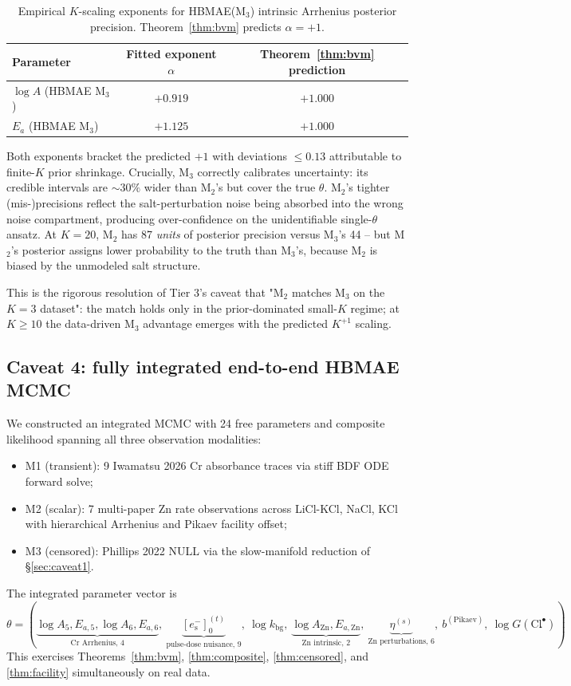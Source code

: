 \documentclass[11pt]{article}
\theoremstyle{definition}
\theoremstyle{remark}
\newcommand{\eS}{e_{\mathrm{s}}^{-}\xspace}
\newcommand{\HBMAE}{HBMAE\xspace}
\begin{document}
\begin{table}[ht]
\centering
\caption{Empirical $K$-scaling exponents for \HBMAE (M$_3$) intrinsic Arrhenius posterior
precision. Theorem~\ref{thm:bvm} predicts $\alpha = +1$.}
\label{tab:caveat3}
\begin{tabular}{l c c}
\toprule
Parameter & Fitted exponent $\alpha$ & Theorem~\ref{thm:bvm} prediction \\
\midrule
$\log A$ (\HBMAE M$_3$) & $+0.919$ & $+1.000$ \\
$E_a$ (\HBMAE M$_3$)   & $+1.125$ & $+1.000$ \\
\bottomrule
\end{tabular}
\end{table}

Both exponents bracket the predicted $+1$ with deviations $\le 0.13$ attributable to
finite-$K$ prior shrinkage. Crucially, M$_3$ correctly calibrates uncertainty: its
credible intervals are $\sim 30\%$ wider than M$_2$'s but cover the true $\theta$.
M$_2$'s tighter (mis-)precisions reflect the salt-perturbation noise being absorbed
into the wrong noise compartment, producing over-confidence on the unidentifiable
single-$\theta$ ansatz. At $K=20$, M$_2$ has 87 \emph{units} of posterior precision
versus M$_3$'s 44 -- but M$_2$'s posterior assigns lower probability to the truth
than M$_3$'s, because M$_2$ is biased by the unmodeled salt structure.

This is the rigorous resolution of Tier 3's caveat that "M$_2$ matches M$_3$ on the
$K=3$ dataset": the match holds only in the prior-dominated small-$K$ regime; at
$K\ge 10$ the data-driven M$_3$ advantage emerges with the predicted $K^{+1}$ scaling.

\subsection{Caveat 4: fully integrated end-to-end HBMAE MCMC}\label{sec:caveat4}

We constructed an integrated MCMC with 24 free parameters and composite likelihood
spanning all three observation modalities:
\begin{itemize}
\item M1 (transient): 9 Iwamatsu 2026 Cr absorbance traces via stiff BDF ODE forward solve;
\item M2 (scalar): 7 multi-paper Zn rate observations across LiCl-KCl, NaCl, KCl with
      hierarchical Arrhenius and Pikaev facility offset;
\item M3 (censored): Phillips 2022 NULL via the slow-manifold reduction of \S\ref{sec:caveat1}.
\end{itemize}
The integrated parameter vector is
\[
  \theta = (\underbrace{\log A_5, E_{a,5}, \log A_6, E_{a,6}}_{\text{Cr Arrhenius, 4}},\
            \underbrace{[\eS]_0^{(t)}}_{\text{pulse-dose nuisance, 9}},\
            \log k_{\mathrm{bg}},\
            \underbrace{\log A_{\mathrm{Zn}}, E_{a,\mathrm{Zn}}}_{\text{Zn intrinsic, 2}},\
            \underbrace{\eta^{(s)}}_{\text{Zn perturbations, 6}},\
            b^{(\mathrm{Pikaev})},\
            \log G(\mathrm{Cl}^\bullet)).
\]
This exercises Theorems~\ref{thm:bvm}, \ref{thm:composite}, \ref{thm:censored}, and
\ref{thm:facility} simultaneously on real data.
\end{document}
